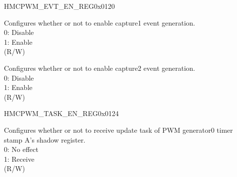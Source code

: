 \begin{register}{H}{MCPWM\_EVT\_EN\_REG}{0x0120}
\begin{regdesc}
\begin{reglist}
\label{fielddesc:MCPWMEVTCAP1EN}\item [MCPWM\_EVT\_CAP1\_EN] Configures whether or not to enable capture1 event generation. \\0: Disable \\1: Enable \\(R/W)
\label{fielddesc:MCPWMEVTCAP2EN}\item [MCPWM\_EVT\_CAP2\_EN] Configures whether or not to enable capture2 event generation. \\0: Disable \\1: Enable \\(R/W)
\end{reglist}\end{regdesc}
\end{register}


\begin{register}{H}{MCPWM\_TASK\_EN\_REG}{0x0124}\label{regdesc:MCPWMTASKENREG}
%
%
%
%
%
%
%
%
%
%
%
%
%
%
%
%
%
%
%
%
%
%
%
\regnewline%
\begin{regdesc}\begin{reglist}
\label{fielddesc:MCPWMTASKCMPR0AUPEN}\item [MCPWM\_TASK\_CMPR0\_A\_UP\_EN] Configures whether or not to receive update task of PWM generator0 timer stamp A's shadow register. \\0: No effect \\1: Receive \\(R/W)

\end{reglist}
\end{regdesc}
\end{register}
